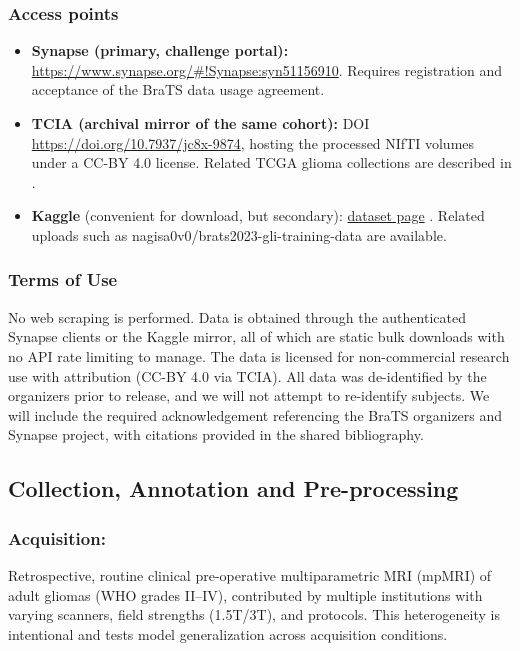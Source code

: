 \subsubsection{Access points}
\begin{itemize}
    \item \textbf{Synapse (primary, challenge portal):} \url{https://www.synapse.org/#!Synapse:syn51156910}. Requires registration and acceptance of the BraTS data usage agreement.
    \item \textbf{TCIA (archival mirror of the same cohort):} DOI \url{https://doi.org/10.7937/jc8x-9874}, hosting the processed NIfTI volumes under a CC-BY 4.0 license. Related TCGA glioma collections are described in \cite{bakas2017tcgagbm,bakas2017tcgalgg}.

    \item \textbf{Kaggle} (convenient for download, but secondary): \href{https://www.kaggle.com/datasets/luumsk/asnr-miccai-brats-2023-gli-challenge-training-data}{dataset page} \cite{kagglebrats2023}.
    Related uploads such as nagisa0v0/brats2023-gli-training-data are available.
\end{itemize}
\subsubsection{Terms of Use}
No web scraping is performed. Data is obtained through the authenticated Synapse clients or the Kaggle mirror, all of which are static bulk downloads with no API rate limiting to manage. The data is licensed for non-commercial research use with attribution (CC-BY 4.0 via TCIA). All data was de-identified by the organizers prior to release, and we will not attempt to re-identify subjects. We will include the required acknowledgement referencing the BraTS organizers and Synapse
project, with citations provided in the shared bibliography.
\subsection{Collection, Annotation and Pre-processing}

    \subsubsection{Acquisition:}Retrospective, routine clinical pre-operative multiparametric MRI (mpMRI) of adult gliomas (WHO grades II--IV), contributed by multiple institutions with varying scanners, field strengths (1.5T/3T), and protocols. This heterogeneity is intentional and tests model generalization across acquisition conditions.

